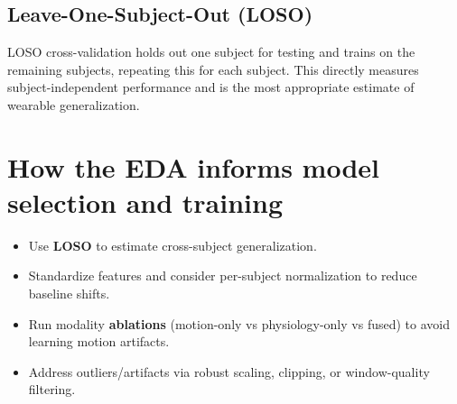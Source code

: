 \documentclass[11pt]{article}
\begin{document}
\subsection{Leave-One-Subject-Out (LOSO)}
LOSO cross-validation holds out one subject for testing and trains on the remaining subjects, repeating this for each subject.
This directly measures subject-independent performance and is the most appropriate estimate of wearable generalization.

\section{How the EDA informs model selection and training}
\begin{itemize}
  \item Use \textbf{LOSO} to estimate cross-subject generalization.
  \item Standardize features and consider per-subject normalization to reduce baseline shifts.
  \item Run modality \textbf{ablations} (motion-only vs physiology-only vs fused) to avoid learning motion artifacts.
  \item Address outliers/artifacts via robust scaling, clipping, or window-quality filtering.
\end{itemize}
\end{document}
